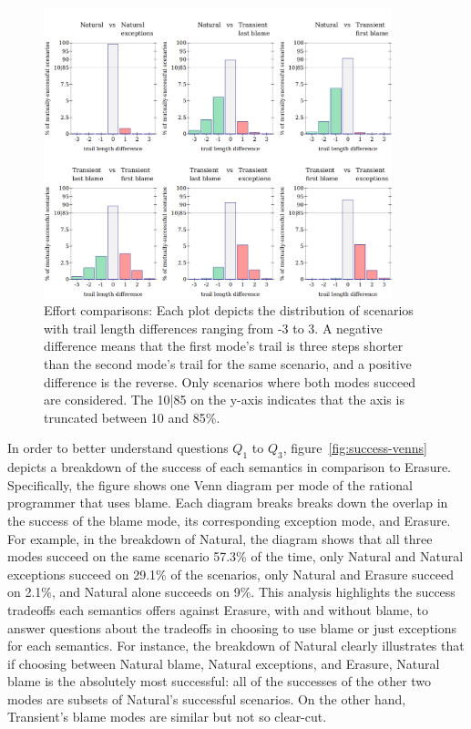 \begin{figure}
  \centering
  \includegraphics[width=0.9\textwidth]{./plots/bt-length-comparisons}
  \caption{Effort comparisons: Each plot depicts the distribution of scenarios with trail length differences ranging from -3 to 3.
  A negative difference means that the first mode's trail is three steps shorter than the second mode's trail for the same scenario, and a positive difference is the reverse.
  Only scenarios where both modes succeed are considered.
  The 10|85 on the y-axis indicates that the axis is truncated between 10 and 85\%.}
  \label{fig:effort-comparisons}
\end{figure}

In order to better understand questions $Q_1$ to $Q_3$, figure~\ref{fig:success-venns} depicts a breakdown of the success of each semantics in comparison to Erasure.
Specifically, the figure shows one Venn diagram per mode of the rational programmer that uses blame.
Each diagram breaks breaks down the overlap in the success of the blame mode, its corresponding exception mode, and Erasure.
For example, in the breakdown of Natural, the diagram shows that all three modes succeed on the same scenario 57.3\% of the time, only Natural and Natural exceptions succeed on 29.1\% of the scenarios, only Natural and Erasure succeed on 2.1\%, and Natural alone succeeds on 9\%.
This analysis highlights the success tradeoffs each semantics offers against Erasure, with and without blame, to answer questions about the tradeoffs in choosing to use blame or just exceptions for each semantics.
For instance, the breakdown of Natural clearly illustrates that if choosing between Natural blame, Natural exceptions, and Erasure, Natural blame is the absolutely most successful: all of the successes of the other two modes are subsets of Natural's successful scenarios.
On the other hand, Transient's blame modes are similar but not so clear-cut.


